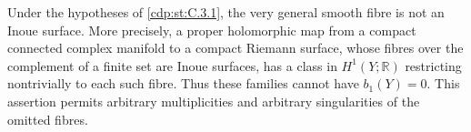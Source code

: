 \begin{proposition}\hypertarget{tag-01F7}{}\label{cdp:st:C.3.12}


Under the hypotheses of \ref{cdp:st:C.3.1}, the very general smooth fibre is
not an Inoue surface. More precisely, a proper holomorphic map from
a compact connected complex manifold to a compact Riemann surface,
whose fibres over the complement of a finite set are Inoue surfaces,
has a class in $H^1(Y;\mathbb R)$ restricting nontrivially to each
such fibre. Thus these families cannot have $b_1(Y)=0$.
This assertion permits arbitrary multiplicities and arbitrary
singularities of the omitted fibres.
\end{proposition}


